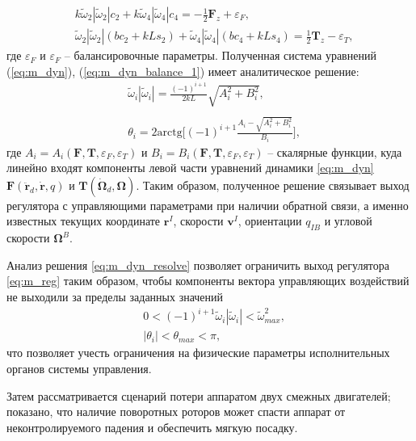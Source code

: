 \begin{equation} \label{eq:m_dyn_balance_2}
\begin{aligned}
&k \tilde\omega_2 |\tilde\omega_2| c_2 + k \tilde\omega_4 |\tilde\omega_4| c_4 =
-\frac{1}{2} \bm F_z + \varepsilon_F,
\\
&\tilde\omega_2 |\tilde\omega_2| (bc_2 + kLs_2)
+ \tilde\omega_4 |\tilde\omega_4| (bc_4 + kLs_4) =
\frac{1}{2} \bm T_z - \varepsilon_T,
\end{aligned}
\end{equation}
где $\varepsilon_F$ и $\varepsilon_F$ -- балансировочные параметры.
Полученная система уравнений (\ref{eq:m_dyn}), (\ref{eq:m_dyn_balance_1}) имеет аналитическое решение:
\begin{equation} \label{eq:m_dyn_resolve}
\begin{aligned}
&\tilde\omega_i |\tilde\omega_i| =
\frac{(-1)^{i+1}}{2kL}\sqrt{
	A^2_i + 
	B^2_i
},
\\
\phantom{}
\\
&\theta_i = 
2 \text{arctg} \Bigg[(-1)^{i+1}	
\frac{A_i -
	\sqrt{
		A^2_i + 
		B^2_i
}}
{B_i}
\Bigg],
\end{aligned}
\end{equation}
где $A_i = A_i(\bm F, \bm T, \varepsilon_F, \varepsilon_T)$
и
$B_i = B_i(\bm F, \bm T, \varepsilon_F, \varepsilon_T)$
-- скалярные функции, куда линейно входят компоненты левой части уравнений динамики \eqref{eq:m_dyn}
$\bm F(\ddot{\bm r}_d, \dot{\bm r}, q)$
и
$\bm T(\dot{\bm \Omega}_d, \bm\Omega)$.
Таким образом, полученное решение связывает выход регулятора с управляющими параметрами при наличии обратной связи, а именно известных текущих координате $\bm r^I$, скорости $\bm v^I$, ориентации $q_{IB}$ и угловой скорости $\bm \Omega^B$.

Анализ решения \eqref{eq:m_dyn_resolve} позволяет ограничить выход регулятора \eqref{eq:m_reg} таким образом, чтобы компоненты вектора управляющих воздействий не выходили за пределы заданных значений 
\begin{equation} \label{eq:m_limits_init}
\begin{aligned}
&0< (-1)^{i+1} \tilde \omega_i |\tilde\omega_i| < \tilde \omega_{max}^2,
\\
&|\theta_i| < \theta_{max} < \pi,
\end{aligned}
\end{equation}
что позволяет учесть ограничения на физические параметры исполнительных органов системы управления.

Затем рассматривается сценарий потери аппаратом двух смежных двигателей; показано, что наличие поворотных роторов может спасти аппарат от неконтролируемого падения и обеспечить мягкую посадку.



